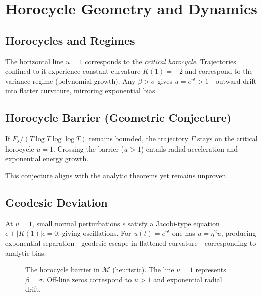 \section{Horocycle Geometry and Dynamics}\label{sec:horocycle}

\subsection{Horocycles and Regimes}

The horizontal line $u=1$ corresponds to the \emph{critical horocycle}.
Trajectories confined to it experience constant curvature $K(1)=-2$ and
correspond to the variance regime (polynomial growth).
Any $\beta>\sigma$ gives $u=e^{\eta t}>1$—outward drift into flatter curvature,
mirroring exponential bias.

\subsection{Horocycle Barrier (Geometric Conjecture)}

\begin{geoconj}
If $F_\lambda/(T\log T\log\log T)$ remains bounded, the trajectory
$\Gamma$ stays on the critical horocycle $u=1$.
Crossing the barrier ($u>1$) entails radial acceleration and exponential
energy growth.
\end{geoconj}

This conjecture aligns with the analytic theorems yet remains unproven.

\subsection{Geodesic Deviation}

At $u=1$, small normal perturbations $\epsilon$ satisfy a Jacobi-type equation
$\ddot{\epsilon}+|K(1)|\epsilon=0$, giving oscillations.
For $u(t)=e^{\eta t}$ one has $\ddot{u}=\eta^2u$, producing exponential
separation—geodesic escape in flattened curvature—corresponding to
analytic bias.

\begin{figure}[h]
\centering
{}
\caption{The horocycle barrier in $\mathcal{M}$ (heuristic).
The line $u=1$ represents $\beta=\sigma$.  Off-line zeros correspond to
$u>1$ and exponential radial drift.}
\label{fig:horocycle}
\end{figure}

